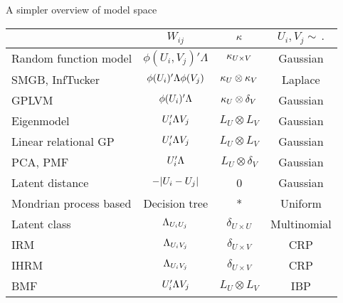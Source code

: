 \begin{frame}{A simpler overview of model space}
  \begin{block}{}
  \centering
  \begin{tabular}{l|ccc}%
    & $W_{ij}$ & $\kappa$ & $U_i, V_j \sim \, .$ \\%
    \midrule
    Random function model & $\phi(U_i, V_j)'\Lambda$ & $\kappa_{U\times V}$ & Gaussian\\%
    SMGB, InfTucker & $\phi(U_i)'\Lambda\phi(V_j)$ & $\kappa_U \otimes \kappa_V$ & Laplace \\%
    GPLVM & $\phi(U_i)'\Lambda$ & $\kappa_U \otimes \delta_V$ & Gaussian \\%
    Eigenmodel & $U_i'\Lambda V_j$ & $L_U \otimes L_V$ & Gaussian \\%
    Linear relational GP & $U_i'\Lambda V_j$ & $L_U \otimes L_V$ & Gaussian \\%
    PCA, PMF & $U_i'\Lambda$ & $L_U \otimes \delta_V$ & Gaussian \\%
    Latent distance & $-|U_i - U_j|$ & 0 & Gaussian \\%
    Mondrian process based & Decision tree & * & Uniform \\%
    \midrule
    Latent class & $\Lambda_{U_iU_j}$ & $\delta_{U\times U}$ & Multinomial \\%
    IRM &$\Lambda_{U_iV_j}$ & $\delta_{U\times V}$ & CRP \\%
    IHRM  &$\Lambda_{U_iV_j}$ & $\delta_{U\times V}$ & CRP \\%
    BMF  & $U_i'\Lambda V_j$ & $L_U \otimes L_V$ & IBP \\%

\end{tabular}
\end{block}
\end{frame}
